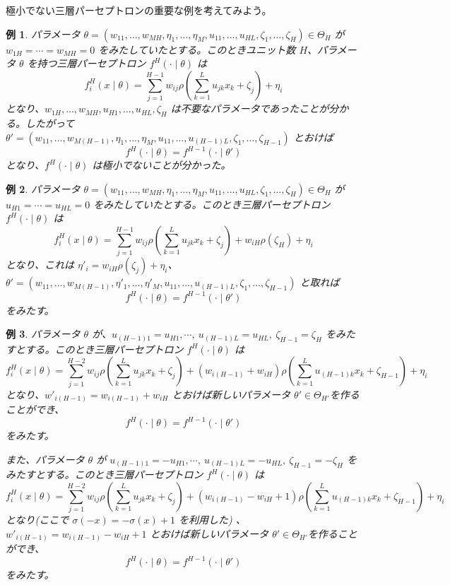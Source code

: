 \documentclass{jsarticle}
\newtheorem{example}{例}
\begin{document}
極小でない三層パーセプトロンの重要な例を考えてみよう。
\begin{example}
  パラメータ $\theta = (w_{11},\ldots, w_{MH}, \eta_1, \ldots, \eta_M, u_{11},\ldots, u_{HL}, \zeta_1, \ldots, \zeta_H) \in \Theta_H$ が $w_{1H} = \cdots = w_{MH} = 0$ をみたしていたとする。このときユニット数 $H$、パラメータ $\theta$ を持つ三層パーセプトロン $f^H(\cdot\mid\theta)$ は
  \[
    f_i^H(x\mid\theta) = \sum_{j=1}^{H-1}w_{ij}\rho\left(\sum_{k=1}^L u_{jk}x_k + \zeta_j\right) + \eta_i
  \]
  となり、$w_{1H}, \ldots, w_{MH}, u_{H1},\ldots, u_{HL}, \zeta_H$ は不要なパラメータであったことが分かる。したがって $\theta' = (w_{11}, \ldots, w_{M(H-1)}, \eta_1, \ldots, \eta_M, u_{11}, \ldots, u_{(H-1)L}, \zeta_1, \ldots, \zeta_{H-1})$ とおけば
  \[
    f^H(\cdot\mid\theta) = f^{H-1}(\cdot\mid\theta')
  \]
  となり、$f^H(\cdot\mid\theta)$ は極小でないことが分かった。
\end{example}
\begin{example}
  パラメータ $\theta = (w_{11},\ldots, w_{MH}, \eta_1, \ldots, \eta_M, u_{11},\ldots, u_{HL}, \zeta_1, \ldots, \zeta_H) \in \Theta_H$ が $u_{H1} = \cdots = u_{HL} = 0$ をみたしていたとする。このとき三層パーセプトロン $f^H(\cdot\mid\theta)$ は
  \begin{equation*}
    f_i^H(x\mid\theta) = \sum_{j=1}^{H-1} w_{ij}\rho\left(\sum_{k=1}^L u_{jk}x_k + \zeta_j\right)+ w_{iH}\rho(\zeta_H) + \eta_i
  \end{equation*}
  となり、これは $\eta'_i = w_{iH}\rho(\zeta_j) + \eta_i$、$\theta' = (w_{11},\ldots, w_{M(H-1)},\eta'_1,\ldots, \eta'_M, u_{11}, \ldots, u_{(H-1)L}, \zeta_1,\ldots, \zeta_{H-1})$ と取れば
  \[
    f^H(\cdot\mid\theta) = f^{H-1}(\cdot\mid\theta')
  \]
  をみたす。
\end{example}
\begin{example}
  パラメータ $\theta$ が、$u_{(H-1)1} = u_{H1}, \cdots,\  u_{(H-1)L} = u_{HL},\  \zeta_{H-1} = \zeta_H$ をみたすとする。このとき三層パーセプトロン $f^H(\cdot\mid\theta)$ は
  \[
    f_i^H(x\mid\theta) = \sum_{j=1}^{H-2}w_{ij}\rho\left(\sum_{k=1}^L u_{jk}x_k + \zeta_j\right) + (w_{i(H-1)} + w_{iH})\rho\left(\sum_{k=1}^L u_{(H-1)k}x_k + \zeta_{H-1}\right) + \eta_i
  \]
  となり、$w'_{i(H-1)} = w_{i(H-1)} + w_{iH}$ とおけば新しいパラメータ $\theta' \in \Theta_{H'}$を作ることができ、
  \[
    f^H(\cdot\mid\theta) = f^{H-1}(\cdot\mid\theta')
  \]
  をみたす。

  また、パラメータ $\theta$ が $u_{(H-1)1} = -u_{H1}, \cdots,\  u_{(H-1)L} = -u_{HL},\  \zeta_{H-1} = -\zeta_H$ をみたすとする。このとき三層パーセプトロン $f^H(\cdot\mid\theta)$ は
  \[
    f_i^H(x\mid\theta) = \sum_{j=1}^{H-2}w_{ij}\rho\left(\sum_{k=1}^L u_{jk}x_k + \zeta_j\right) + (w_{i(H-1)} - w_{iH} + 1)\rho\left(\sum_{k=1}^L u_{(H-1)k}x_k + \zeta_{H-1}\right) + \eta_i
  \]
  となり(ここで $\sigma(-x) = -\sigma(x) + 1$ を利用した) 、$w'_{i(H-1)} = w_{i(H-1)} - w_{iH} + 1$ とおけば新しいパラメータ $\theta' \in \Theta_{H'}$を作ることができ、
  \[
    f^H(\cdot\mid\theta) = f^{H-1}(\cdot\mid\theta')
  \]
  をみたす。
\end{example}
\end{document}
